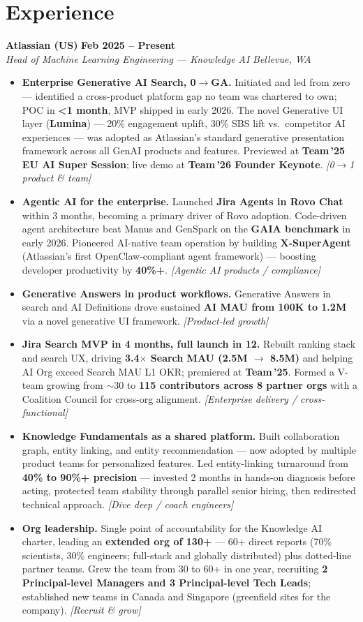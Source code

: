\documentclass[10.5pt,letterpaper]{article}
\newcommand{\role}[4]{%
  \noindent\textbf{#1} \hfill \textbf{#3}\\
  \textit{#2} \hfill \textit{#4}\par\vspace{2pt}}
\newcommand{\lp}[1]{\textcolor{blue!55!black}{\small\textit{[#1]}}}
\begin{document}
\section*{Experience}

\role{Atlassian (US)}{Head of Machine Learning Engineering --- Knowledge AI}{Feb 2025 -- Present}{Bellevue, WA}
\begin{itemize}
  \item \textbf{Enterprise Generative AI Search, 0$\to$GA.} Initiated and led from zero --- identified a cross-product platform gap no team was chartered to own; POC in \textbf{<1 month}, MVP shipped in early 2026. The novel Generative UI layer (\textbf{Lumina}) --- 20\% engagement uplift, 30\% SBS lift vs.\ competitor AI experiences --- was adopted as Atlassian's standard generative presentation framework across all GenAI products and features. Previewed at \textbf{Team\,'25 EU AI Super Session}; live demo at \textbf{Team\,'26 Founder Keynote}. \lp{0$\to$1 product \& team}
  \item \textbf{Agentic AI for the enterprise.} Launched \textbf{Jira Agents in Rovo Chat} within 3 months, becoming a primary driver of Rovo adoption. Code-driven agent architecture beat Manus and GenSpark on the \textbf{GAIA benchmark} in early 2026. Pioneered AI-native team operation by building \textbf{X-SuperAgent} (Atlassian's first OpenClaw-compliant agent framework) --- boosting developer productivity by \textbf{40\%+}. \lp{Agentic AI products / compliance}
  \item \textbf{Generative Answers in product workflows.} Generative Answers in search and AI Definitions drove sustained \textbf{AI MAU from 100K to 1.2M} via a novel generative UI framework. \lp{Product-led growth}
  \item \textbf{Jira Search MVP in 4 months, full launch in 12.} Rebuilt ranking stack and search UX, driving \textbf{3.4$\times$ Search MAU (2.5M $\to$ 8.5M)} and helping AI Org exceed Search MAU L1 OKR; premiered at \textbf{Team\,'25}. Formed a V-team growing from $\sim$30 to \textbf{115 contributors across 8 partner orgs} with a Coalition Council for cross-org alignment. \lp{Enterprise delivery / cross-functional}
  \item \textbf{Knowledge Fundamentals as a shared platform.} Built collaboration graph, entity linking, and entity recommendation --- now adopted by multiple product teams for personalized features. Led entity-linking turnaround from \textbf{40\% to 90\%+ precision} --- invested 2 months in hands-on diagnosis before acting, protected team stability through parallel senior hiring, then redirected technical approach. \lp{Dive deep / coach engineers}
  \item \textbf{Org leadership.} Single point of accountability for the Knowledge AI charter, leading an \textbf{extended org of 130+} --- 60+ direct reports (70\% scientists, 30\% engineers; full-stack and globally distributed) plus dotted-line partner teams. Grew the team from 30 to 60+ in one year, recruiting \textbf{2 Principal-level Managers and 3 Principal-level Tech Leads}; established new teams in Canada and Singapore (greenfield sites for the company). \lp{Recruit \& grow}
\end{itemize}
\end{document}
